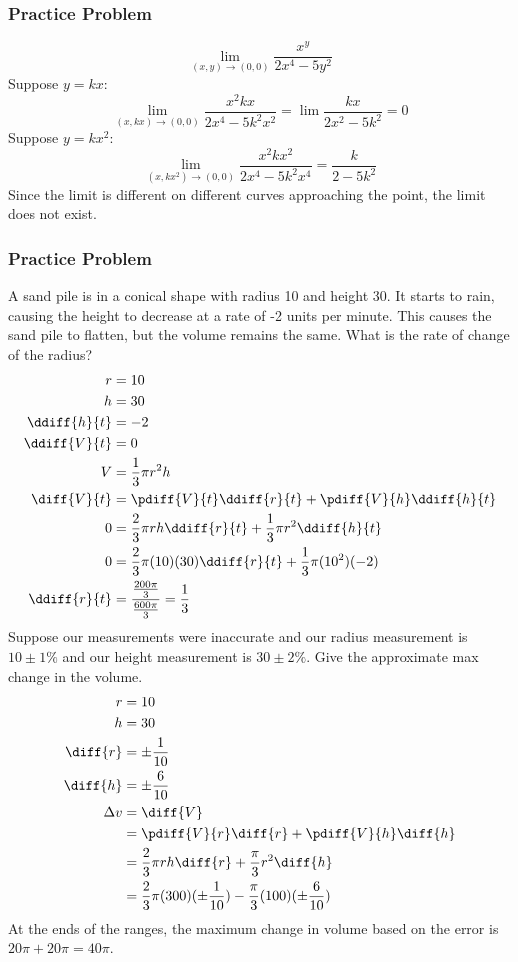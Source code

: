 \documentclass{math}
\begin{document}
\subsubsection*{Practice Problem}
\[ \lim_{(x,y)\to(0,0)}\frac{x^y}{2x^4-5y^2} \]
Suppose \( y = kx \):
\[ \lim_{(x,kx)\to(0,0)}\frac{x^2kx}{2x^4-5k^2x^2} =
  \lim\frac{kx}{2x^2-5k^2} = 0 \]
Suppose \( y = kx^2 \):
\[ \lim_{(x,kx^2)\to(0,0)}\frac{x^2kx^2}{2x^4-5k^2x^4} =
  \frac{k}{2-5k^2} \]
Since the limit is different on different curves approaching the point, the
limit does not exist.

\subsubsection*{Practice Problem}
A sand pile is in a conical shape with radius 10 and height 30. It starts to
rain, causing the height to decrease at a rate of -2 units per minute. This
causes the sand pile to flatten, but the volume remains the same. What is the
rate of change of the radius?
\begin{align*}
  r &= 10 \\
  h &= 30 \\
  \ddiff{h}{t} &= -2 \\
  \ddiff{V}{t} &= 0 \\
  V &= \frac{1}{3}\pi r^2h \\
  \diff{V}{t} &= \pdiff{V}{t}\ddiff{r}{t}+\pdiff{V}{h}\ddiff{h}{t} \\
  0 &= \frac{2}{3}\pi rh\ddiff{r}{t}+\frac{1}{3}\pi r^2\ddiff{h}{t} \\
  0 &= \frac{2}{3}\pi(10)(30)\ddiff{r}{t}+\frac{1}{3}\pi(10^2)(-2) \\
  \ddiff{r}{t} &= \frac{\frac{200\pi}{3}}{\frac{600\pi}{3}} = \frac{1}{3}
\end{align*}
Suppose our measurements were inaccurate and our radius measurement is
\( 10\pm1\% \) and our height measurement is \( 30\pm2\% \). Give the
approximate max change in the volume.
\begin{align*}
  r &= 10 \\
  h &= 30 \\
  \diff{r} &= \pm\frac{1}{10} \\
  \diff{h} &= \pm\frac{6}{10} \\
  \Delta{v} &= \diff{V} \\
  &= \pdiff{V}{r}\diff{r}+\pdiff{V}{h}\diff{h} \\
  &= \frac{2}{3}\pi rh\diff{r}+\frac{\pi}{3}r^2\diff{h} \\
  &= \frac{2}{3}\pi(300)(\pm\frac{1}{10})-\frac{\pi}{3}(100)(\pm\frac{6}{10}) \\
\end{align*}
At the ends of the ranges, the maximum change in volume based on the error is
\( 20\pi+20\pi = 40\pi \).
\end{document}
